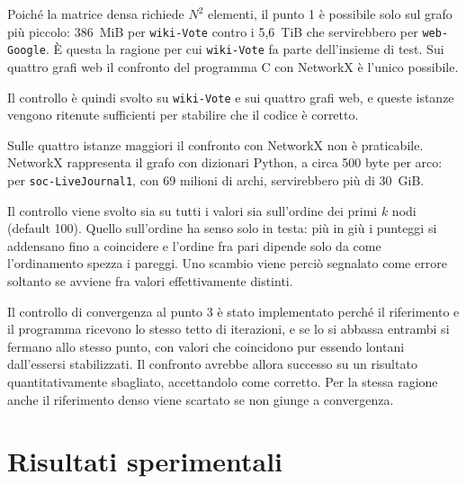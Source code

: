 \documentclass[11pt,a4paper]{article}
\newcommand{\stacco}{\par\medskip\noindent}
\begin{document}
\stacco
Poiché la matrice densa richiede $N^2$ elementi, il punto 1 è possibile solo
sul grafo più piccolo: 386~MiB per \texttt{wiki-Vote} contro i 5,6~TiB che
servirebbero per \texttt{web-Google}. È questa la ragione per cui
\texttt{wiki-Vote} fa parte dell'insieme di test. Sui quattro grafi web il
confronto del programma C con NetworkX è l'unico possibile.

\stacco
Il controllo è quindi svolto su \texttt{wiki-Vote} e sui quattro grafi
web, e queste istanze vengono ritenute sufficienti per stabilire che il codice è
corretto.

\stacco
Sulle quattro istanze maggiori il confronto con NetworkX non è
praticabile. NetworkX rappresenta il grafo con dizionari Python, a circa 500
byte per arco: per \texttt{soc-LiveJournal1}, con 69 milioni di archi,
servirebbero più di 30~GiB.

\stacco
Il controllo viene svolto sia su tutti i valori sia sull'ordine dei primi $k$ nodi (default 100).
Quello sull'ordine ha senso solo in testa: più in giù i
punteggi si addensano fino a coincidere e l'ordine fra pari dipende solo 
da come l'ordinamento spezza i pareggi. Uno scambio viene perciò segnalato 
come errore soltanto se avviene fra valori effettivamente distinti.

\stacco
Il controllo di convergenza al punto 3 è stato implementato perché il riferimento e il
programma ricevono lo stesso tetto di iterazioni, e se lo si abbassa entrambi
si fermano allo stesso punto, con valori che coincidono pur essendo lontani
dall'essersi stabilizzati. Il confronto avrebbe allora successo su un risultato
quantitativamente sbagliato, accettandolo come corretto. Per la stessa ragione
anche il riferimento denso viene scartato se non giunge a convergenza.

\section{Risultati sperimentali}
\end{document}
